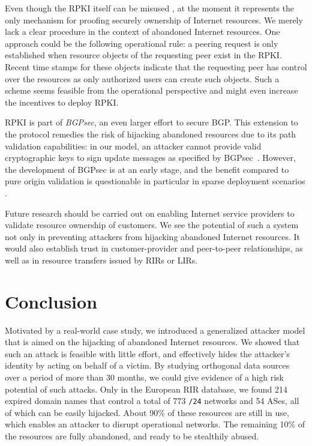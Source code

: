\documentclass{llncs}
\begin{document}
Even though the RPKI itself can be misused \cite{chbrg-rmra-13}, at the moment
it represents the only mechanism for proofing securely ownership of Internet
resources. We merely lack a clear procedure in the context of abandoned
Internet resources. One approach could be the following operational rule: a
peering request is only established when resource objects of the requesting
peer exist in the RPKI. Recent time stamps for these objects indicate that the
requesting peer has control over the resources as only authorized users can
create such objects.  Such a scheme seems feasible from the operational
perspective and might even increase the incentives to deploy RPKI.

RPKI is part of \textit{BGPsec}, an even larger effort to secure BGP. This
extension to the protocol remedies the risk of hijacking abandoned resources
due to its path validation capabilities: in our model, an attacker cannot
provide valid cryptographic keys to sign update messages as specified by
BGPsec~\cite{draft-bgpsec-spec}. However, the development of BGPsec is at an
early stage, and the benefit compared to pure origin validation is questionable
in particular in sparse deployment scenarios \cite{lgs-bspdj-13}.

Future research should be carried out on enabling Internet service providers to
validate resource ownership of customers. We see the potential of such a system
not only in preventing attackers from hijacking abandoned Internet resources.
It would also establish trust in customer-provider and peer-to-peer
relationships, as well as in resource transfers issued by RIRs or LIRs. 

\section{Conclusion} \label{sec:conclusion}

Motivated by a real-world case study, we introduced a generalized attacker
model that is aimed on the hijacking of abandoned Internet resources. We showed
that such an attack is feasible with little effort, and effectively hides the
attacker's identity by acting on behalf of a victim. By studying orthogonal
data sources over a period of more than 30 months, we could give evidence of a
high risk potential of such attacks. Only in the European RIR database, we
found 214 expired domain names that control a total of 773 \texttt{/24}
networks and 54 ASes, all of which can be easily hijacked. About 90\% of these
resources are still in use, which enables an attacker to disrupt operational
networks. The remaining 10\% of the resources are fully abandoned,
and ready to be stealthily abused.
\end{document}
